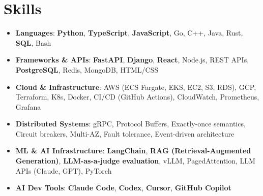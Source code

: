 \documentclass[letterpaper,11pt]{article}
\newcommand{\resumeSubHeadingListStart}{\begin{itemize}[leftmargin=0.15in, label={}]}
\newcommand{\resumeSubHeadingListEnd}{\end{itemize}}
\newcommand{\resumeSkillHeading}[2]{%
  \item\small{\textbf{#1}: #2 \vspace{-9pt}}%
}
\begin{document}
\section{Skills}
  \resumeSubHeadingListStart
    \resumeSkillHeading{Languages}{\textbf{Python}, \textbf{TypeScript}, \textbf{JavaScript}, Go, C++, Java, Rust, \textbf{SQL}, Bash}
    \resumeSkillHeading{Frameworks \& APIs}{\textbf{FastAPI}, \textbf{Django}, \textbf{React}, Node.js, REST APIs, \textbf{PostgreSQL}, Redis, MongoDB, HTML/CSS}
    \resumeSkillHeading{Cloud \& Infrastructure}{AWS (ECS Fargate, EKS, EC2, S3, RDS), GCP, Terraform, K8s, Docker, CI/CD (GitHub Actions), CloudWatch, Prometheus, Grafana}
    \resumeSkillHeading{Distributed Systems}{gRPC, Protocol Buffers, Exactly-once semantics, Circuit breakers, Multi-AZ, Fault tolerance, Event-driven architecture}
    \resumeSkillHeading{ML \& AI Infrastructure}{\textbf{LangChain}, \textbf{RAG (Retrieval-Augmented Generation)}, \textbf{LLM-as-a-judge evaluation}, vLLM, PagedAttention, LLM APIs (Claude, GPT), PyTorch}
    \resumeSkillHeading{AI Dev Tools}{\textbf{Claude Code}, \textbf{Codex}, \textbf{Cursor}, \textbf{GitHub Copilot}}
  \resumeSubHeadingListEnd
\end{document}
